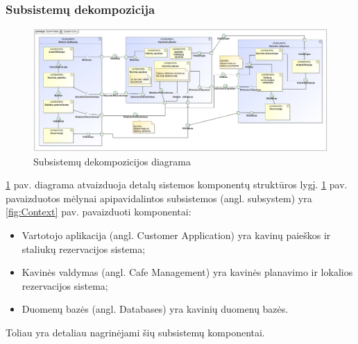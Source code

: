\documentclass{VUMIFPSkursinis}
\begin{document}
{{{{{\begin{landscape}
\subsubsection{Subsistemų dekompozicija}
	\begin {figure}[H]
		\includegraphics[width=1.67\textwidth,height=1.67\textheight,keepaspectratio]{img/SystemCore}
		\caption{Subsistemų dekompozicijos diagrama}
		\label{fig:System Core}
	\end{figure}
\end{landscape}

\ref {fig:System Core} pav. diagrama atvaizduoja detalų sistemos komponentų struktūros lygį. \ref {fig:System Core} pav. pavaizduotos mėlynai apipavidalintos subsistemos (angl. subsystem) yra \ref {fig:Context} pav. pavaizduoti komponentai:
\begin{itemize}
  \item Vartotojo aplikacija (angl. Customer Application) yra kavinų paieškos ir staliukų rezervacijos sistema;
  \item Kavinės valdymas (angl. Cafe Management) yra kavinės planavimo ir lokalios rezervacijos sistema;
  \item Duomenų bazės (angl. Databases) yra kavinių duomenų bazės.
\end{itemize}
Toliau yra detaliau nagrinėjami šių subsistemų komponentai.\\

}}}}}
\end{document}
